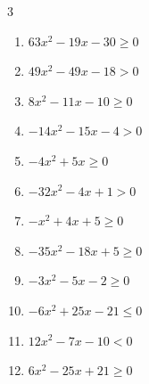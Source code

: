 \begin{multicols}{3}
\begin{enumerate}

  \item $63x^{2}-19x-30\geq 0$


  \item $49x^{2}-49x-18>0$


  \item $8x^{2}-11x-10\geq 0$


  \item $-14x^{2}-15x-4>0$


  \item $-4x^{2}+5x\geq 0$


  \item $-32x^{2}-4x+1>0$


  \item $-x^{2}+4x+5\geq 0$

        \phantom{$\displaystyle -1 \leqq x \leqq 5$}

\columnbreak %

  \item $-35x^{2}-18x+5\geq 0$


  \item $-3x^{2}-5x-2\geq 0$


  \item $-6x^{2}+25x-21\leq 0$


  \item $12x^{2}-7x-10<0$


  \item $6x^{2}-25x+21\geq 0$


\end{enumerate}
\end{multicols}

